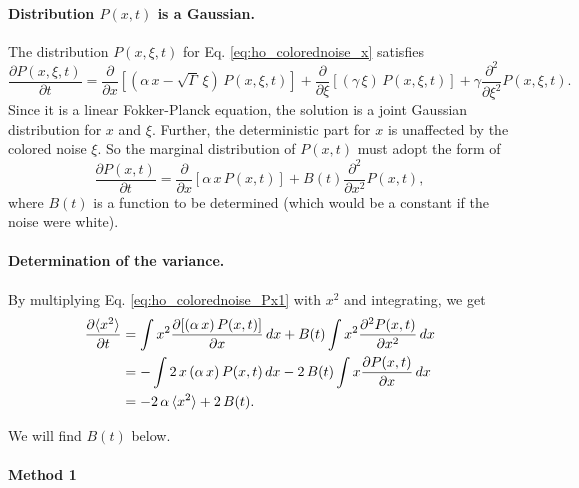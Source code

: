 \documentclass{article}
\begin{document}
\paragraph{Distribution $P(x, t)$ is a Gaussian.}

The distribution $P(x, \xi, t)$ for
Eq. \eqref{eq:ho_colorednoise_x} satisfies
$$
\frac{ \partial P(x, \xi, t) } { \partial t }
=
\frac{ \partial } { \partial x }
\left[
  \left(\alpha \, x - \sqrt{\Gamma} \, \xi \right) \, P(x, \xi, t)
\right]
+
\frac{ \partial } { \partial \xi }
\left[
  (\gamma \, \xi ) \, P(x, \xi, t)
\right]
+
\gamma
\frac{ \partial^2 } { \partial \xi^2} P(x, \xi, t).
$$
Since it is a linear Fokker-Planck equation,
the solution is a joint Gaussian distribution
for $x$ and $\xi$.
%
Further, the deterministic part for $x$
is unaffected by the colored noise $\xi$.
%
So the marginal distribution of $P(x, t)$
must adopt the form of
\begin{equation}
\frac{ \partial P(x, t) } { \partial t }
=
\frac{ \partial } { \partial x }
\left[
  \alpha \, x \, P(x, t)
\right]
+
B(t)
\frac{ \partial^2 } { \partial x^2} P(x, t),
\label{eq:ho_colorednoise_Px1}
\end{equation}
where $B(t)$
is a function to be determined
(which would be a constant if the noise were white).

\paragraph{Determination of the variance.}

By multiplying Eq. \eqref{eq:ho_colorednoise_Px1} with $x^2$ and integrating,
we get
%
\begin{align}
\frac{ \partial \langle x^2 \rangle } { \partial t }
&=
\int x^2 \frac{ \partial [(\alpha \, x) \, P(x, t) ] } { \partial x} \, dx
+ B(t) \int x^2 \frac{ \partial^2 P(x, t) } { \partial x^2 } \, dx
\notag
\\
&=
-\int 2 \, x \, (\alpha \, x) \, P(x, t) \, dx
- 2 \, B(t) \int x \frac{ \partial P(x, t) } { \partial x } \, dx
\notag
\\
&=
- 2 \, \alpha \, \langle x^2 \rangle
+ 2 \, B(t).
\label{eq:dxxdt_Langevin}
\end{align}

We will find $B(t)$ below.

\paragraph{Method 1}
\end{document}
